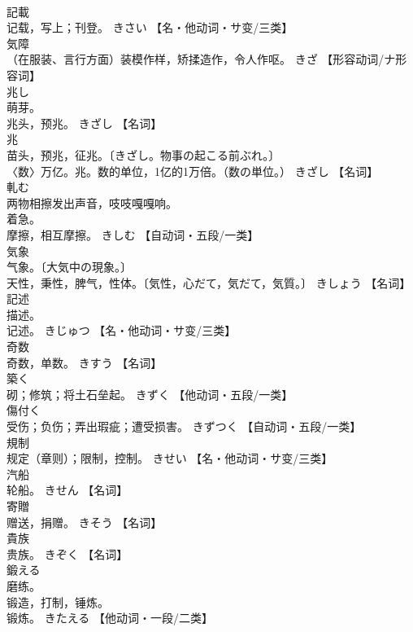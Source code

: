 \documentclass[8pt]{extreport}
\begin{document}
\begin{CJK}{UTF8}{min}
\\	記載	
\\	记载，写上；刊登。	きさい		【名・他动词・サ变/三类】
\\	気障	
\\	（在服装、言行方面）装模作样，矫揉造作，令人作呕。	きざ		【形容动词/ナ形容词】
\\	兆し	
\\	萌芽。 
\\	兆头，预兆。	きざし		【名词】
\\	兆	
\\	苗头，预兆，征兆。〔きざし。物事の起こる前ぶれ。〕 
\\	〈数〉万亿。兆。数的单位，1亿的1万倍。（数の単位。）	きざし		【名词】
\\	軋む	
\\	两物相擦发出声音，吱吱嘎嘎响。 
\\	着急。 
\\	摩擦，相互摩擦。	きしむ		【自动词・五段/一类】
\\	気象	
\\	气象。〔大気中の現象。〕 
\\	天性，秉性，脾气，性体。〔気性，心だて，気だて，気質。〕	きしょう		【名词】
\\	記述	
\\	描述。 
\\	记述。	きじゅつ		【名・他动词・サ变/三类】
\\	奇数	
\\	奇数，单数。	きすう		【名词】
\\	築く	
\\	砌；修筑；将土石垒起。	きずく		【他动词・五段/一类】
\\	傷付く	
\\	受伤；负伤；弄出瑕疵；遭受损害。	きずつく		【自动词・五段/一类】
\\	規制	
\\	规定（章则）；限制，控制。	きせい		【名・他动词・サ变/三类】
\\	汽船	
\\	轮船。	きせん		【名词】
\\	寄贈	
\\	赠送，捐赠。	きそう		【名词】
\\	貴族	
\\	贵族。	きぞく		【名词】
\\	鍛える	
\\	磨练。 
\\	锻造，打制，锤炼。 
\\	锻炼。	きたえる		【他动词・一段/二类】

\end{CJK}
\end{document}
